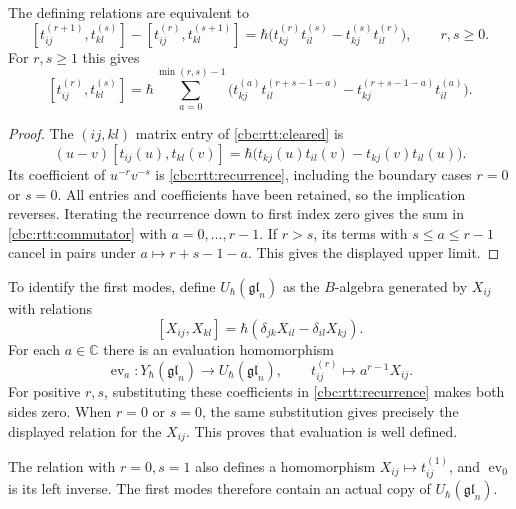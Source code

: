 \begin{proposition}\label{cbc:rtt:coefficients}
The defining relations are equivalent to
\begin{equation}\label{cbc:rtt:recurrence}
 [t_{ij}^{(r+1)},t_{kl}^{(s)}]-[t_{ij}^{(r)},t_{kl}^{(s+1)}]
 =\hbar\bigl(t_{kj}^{(r)}t_{il}^{(s)}-t_{kj}^{(s)}t_{il}^{(r)}\bigr),
 \qquad r,s\geq0.
\end{equation}
For $r,s\geq1$ this gives
\begin{equation}\label{cbc:rtt:commutator}
 [t_{ij}^{(r)},t_{kl}^{(s)}]
 =\hbar\sum_{a=0}^{\min(r,s)-1}
 \bigl(t_{kj}^{(a)}t_{il}^{(r+s-1-a)}
       -t_{kj}^{(r+s-1-a)}t_{il}^{(a)}\bigr).
\end{equation}
\end{proposition}
\begin{proof}
The $(ij,kl)$ matrix entry of \eqref{cbc:rtt:cleared} is
\[
 (u-v)[t_{ij}(u),t_{kl}(v)]
 =\hbar\bigl(t_{kj}(u)t_{il}(v)-t_{kj}(v)t_{il}(u)\bigr).
\]
Its coefficient of $u^{-r}v^{-s}$ is
\eqref{cbc:rtt:recurrence}, including the boundary cases $r=0$ or
$s=0$.  All entries and coefficients have been retained, so the
implication reverses.  Iterating the recurrence down to first index
zero gives the sum in \eqref{cbc:rtt:commutator} with $a=0,\ldots,r-1$.
If $r>s$, its terms with $s\leq a\leq r-1$ cancel in pairs under
$a\mapsto r+s-1-a$.  This gives the displayed upper limit.
\end{proof}

To identify the first modes, define $U_\hbar(\mathfrak{gl}_n)$ as the
$B$-algebra generated by $X_{ij}$ with relations
\[
 [X_{ij},X_{kl}]
 =\hbar(\delta_{jk}X_{il}-\delta_{il}X_{kj}).
\]
For each $a\in\mathbb C$ there is an evaluation homomorphism
\begin{equation}\label{cbc:rtt:evaluation}
 \operatorname{ev}_a:Y_\hbar(\mathfrak{gl}_n)\longrightarrow
 U_\hbar(\mathfrak{gl}_n),\qquad
 t_{ij}^{(r)}\longmapsto a^{r-1}X_{ij}.
\end{equation}
For positive $r,s$, substituting these coefficients in
\eqref{cbc:rtt:recurrence} makes both sides zero.  When $r=0$ or $s=0$,
the same substitution gives precisely the displayed relation for the
$X_{ij}$.  This proves that evaluation is well defined.

The relation with $r=0,s=1$ also defines a homomorphism
$X_{ij}\mapsto t_{ij}^{(1)}$, and $\operatorname{ev}_0$ is its left
inverse.  The first modes therefore contain an actual copy of
$U_\hbar(\mathfrak{gl}_n)$.

